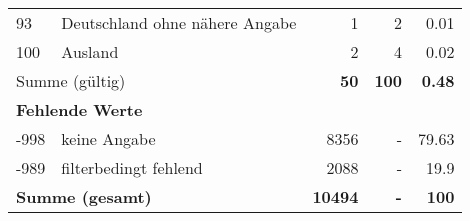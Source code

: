 \begin{longtable}{lXrrr}
     93 &
     \multicolumn{1}{X}{ Deutschland ohne nähere Angabe   } &


       \num{1} &
       \num[round-mode=places,round-precision=2]{2} &
         \num[round-mode=places,round-precision=2]{0,01} \\

     100 &
     \multicolumn{1}{X}{ Ausland   } &


       \num{2} &
       \num[round-mode=places,round-precision=2]{4} &
         \num[round-mode=places,round-precision=2]{0,02} \\
     \midrule
     \multicolumn{2}{l}{Summe (gültig)} &
       \textbf{\num{50}} &
     \textbf{100} &
       \textbf{\num[round-mode=places,round-precision=2]{0,48}} \\
     \multicolumn{5}{l}{\textbf{Fehlende Werte}}\\
       -998 &
       keine Angabe &
         \num{8356} &
        - &
         \num[round-mode=places,round-precision=2]{79,63} \\
       -989 &
       filterbedingt fehlend &
         \num{2088} &
        - &
         \num[round-mode=places,round-precision=2]{19,9} \\
     \midrule
     \multicolumn{2}{l}{\textbf{Summe (gesamt)}} &
          \textbf{\num{10494}} &
        \textbf{-} &
        \textbf{100} \\
     \bottomrule
     \end{longtable}
     
